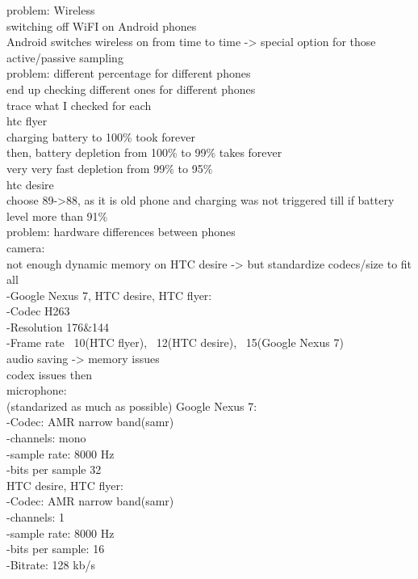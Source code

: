 problem: Wireless\\
	switching off WiFI on Android phones\\
		Android switches wireless on from time to time -> special option for those \\
	active/passive sampling\\

problem: different percentage for different phones\\
	end up checking different ones for different phones\\
		trace what I checked for each\\
		htc flyer\\
			charging battery to 100\% took forever\\
			then, battery depletion from 100\% to 99\% takes forever\\
			very very fast depletion from 99\% to 95\%\\
		htc desire\\
			choose 89->88, as it is old phone and charging was not triggered till if battery level more than 91\%\\
		
problem: hardware differences between phones\\
	camera:\\
		not enough dynamic memory on HTC desire -> but standardize codecs/size to fit all\\
		-Google Nexus 7, HTC desire, HTC flyer:\\
					-Codec H263\\
					-Resolution	176&144\\
					-Frame rate		~10(HTC flyer),	~12(HTC desire),	~15(Google Nexus 7)\\
		audio saving -> memory issues\\
			codex issues then\\
	microphone:\\
		(standarized as much as possible)
		Google Nexus 7:\\
			-Codec: AMR narrow band(samr)\\
			-channels: 		mono\\
			-sample rate:	8000 Hz\\
			-bits per sample 	32\\
		HTC desire, HTC flyer:\\
			-Codec: AMR narrow band(samr)\\
			-channels:		1\\
			-sample rate:	8000 Hz\\
			-bits per sample:	16\\
			-Bitrate:		128 kb/s	\\
			
